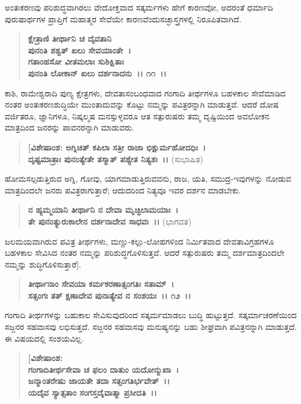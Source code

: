 ಅಂತಃಕರಣವು ಪರಿಶುದ್ಧವಾಗಿರಲು ವೇದೋಕ್ತವಾದ ಸತ್ಕರ್ಮಗಳು ಹೇಗೆ ಕಾರಣವೋ, ಅದರಂತೆ ಧರ್ಮಾದಿ ಪುರುಷಾರ್ಥಗಳ ಪ್ರಾಪ್ತಿಗೆ ಮಹಾತ್ಮರ ಸೇವೆಯೇ ಕಾರಣವೆಂದು\break ಸಚ್ಛಾಸ್ತ್ರಗಳಲ್ಲಿ ನಿರೂಪಿತವಾಗಿದೆ.

\begin{verse}
\textbf{ಕ್ಷೇತ್ರಾಣಿ ತೀರ್ಥಾನಿ ಚ ದೈವತಾನಿ} \\\textbf{ಪುನಂತಿ ಶಶ್ವತ್ ಖಲು ಸೇವಯಾಂತೇ~।}\\\textbf{ಗತಾಂಹಸೋ ವೀತಮಲಾಃ ಸುಶಿಕ್ಷಿತಾಃ} \\\textbf{ಪುನಂತಿ ಲೋಕಾನ್ ಖಲು ದರ್ಶನಾದನು~।। ೧೧~।।}
\end{verse}

ಕಾಶಿ, ರಾಮೇಶ್ವರಾದಿ ಪುಣ್ಯ ಕ್ಷೇತ್ರಗಳು, ದೇವತಾಸಂಬಂಧವಾದ ಗಂಗಾದಿ ತೀರ್ಥಗಳೂ ಬಹಳಕಾಲ ಸೇವೆಮಾಡಿದ ನಂತರ ಅಂತಃಕರಣಶುದ್ಧಿಯೇ ಮುಂತಾದುವನ್ನು ಕೊಟ್ಟು ನಮ್ಮನ್ನು ಪವಿತ್ರರನ್ನಾಗಿ ಮಾಡುತ್ತವೆ. ಆದರೆ ದೋಷ ವರ್ಜಿತರೂ, ಜ್ಞಾನಿಗಳೂ, ನಿಷ್ಕಲ್ಮಷ ಮನಸ್ಸುಳ್ಳವರೂ ಆತ ಸತ್ಪುರುಷರು ತಮ್ಮ ದೃಷ್ಟಿಯಿಂದ ಅವಲೋಕನ ಮಾತ್ರದಿಂದ ಜನರನ್ನು ಪಾವನರನ್ನಾಗಿ ಮಾಡುವರು.

\begin{verse}
\textbf{[ವಿಶೇಷಾಂಶ: ಅಗ್ನಿಚಿತ್ ಕಪಿಲಾ ಸತ್ರೀ ರಾಜಾ ಭಿಕ್ಷುರ್ಮಹೋದಧಿಃ~।}\\\textbf{ದೃಷ್ಟಮಾತ್ರಾಃ ಪುನಂತ್ಯೇತೇ ತಸ್ಮಾತ್ ಪಶ್ಯೇತ ನಿತ್ಯಶಃ~।।} (ಸುಭಾಷಿತ)
\end{verse}

ಹೋಮಸಲ್ಪಡುತ್ತಿರುವ ಅಗ್ನಿ, ಗೋವು, ಯಾಗಮಾಡುತ್ತಿರುವವನು, ರಾಜ, ಯತಿ, ಸಮುದ್ರ-ಇವುಗಳನ್ನು ನೋಡುವ ಮಾತ್ರದಿಂದಲೇ ಜನರು ಪವಿತ್ರರಾಗುತ್ತಾರೆ; ಆದುದರಿಂದ ನಿತ್ಯವೂ ಇವರ ದರ್ಶನ ಮಾಡಬೇಕು.

\begin{verse}
\textbf{ನ ಹ್ಯಮ್ಮಯಾನಿ ತೀರ್ಥಾನಿ ನ ದೇವಾ ಮೃಚ್ಛಿಲಾಮಯಾಃ~।}\\\textbf{ತೇ ಪುನಂತ್ಯುರುಕಾಲೇನ ದರ್ಶನಾದೇವ ಸಾಧವಃ~।।} (ಭಾಗವತ)
\end{verse}

ಜಲಮಯವಾಗಿರುವ ಪವಿತ್ರ ತೀರ್ಥಗಳು, ಮಣ್ಣು-ಕಲ್ಲು-ಲೋಹಗಳಿಂದ ನಿರ್ಮಿತವಾದ ದೇವತಾವಿಗ್ರಹಗಳೂ ಬಹಳಕಾಲ ಸೇವಿಸಿದ ನಂತರ ನಮ್ಮನ್ನು ಪರಿಶುದ್ಧಗೊಳಿಸುತ್ತವೆ. ಆದರೆ ಸತ್ಪುರುಷರು ತಮ್ಮ ದರ್ಶಮಾತ್ರದಿಂದಲೇ ನಮ್ಮನ್ನು ಶುದ್ಧಿಗೊಳಿಸುತ್ತಾರೆ].

\begin{verse}
\textbf{ತೀರ್ಥಾನಾಂ ಸೇವಯಾ ಕರ್ಮಕರಣಾತ್ಸಂಗತಿಃ ಸತಾಮ್~।}\\\textbf{ಸತ್ಸಂಗಃ ತತ್ ಕ್ಷಣಾದೇವ ಪುನಾತ್ಯೇವ ನ ಸಂಶಯಃ~।। ೧೨~।।}
\end{verse}

ಗಂಗಾದಿ ತೀರ್ಥಗಳನ್ನು ಬಹುಕಾಲ ಸೇವಿಸುವುದರಿಂದ ಸತ್ಕರ್ಮಮಾಡಲು ಬುದ್ಧಿ ಹುಟ್ಟುತ್ತದೆ. ಸತ್ಕರ್ಮಾಚರಣೆಯಿಂದ ಸಜ್ಜನರ ಸಹವಾಸವು ಲಭಿಸುತ್ತದೆ. ಸಜ್ಜನರ ಸಹವಾಸವು ಮನುಷ್ಯನನ್ನು ಬಹು ಶೀಘ್ರವಾಗಿ ಪವಿತ್ರನನ್ನಾಗಿ ಮಾಡುತ್ತದೆ. ಈ ವಿಷಯದಲ್ಲಿ ಸಂಶಯವಿಲ್ಲ.

\begin{verse}
\textbf{[ವಿಶೇಷಾಂಶ:}\\\textbf{ಗಂಗಾದಿತೀರ್ಥಸೇವಾ ಚ ಫಲಂ ದಾತುಂ ಯದೋನ್ಮುಖಾ~।}\\\textbf{ಜನ್ಮಾಂತರೇಷು ಜಾಯತೇ ತದಾ ಸತ್ಸಂಗತಿರ್ಭವೇತ್~।।}\\\textbf{ಯದೈವ ಸ್ಯಾತ್ಸತಾಂ ಸಂಗಸ್ತದೈವಾತ್ಮಾ ಪ್ರಸೀದತಿ~।।}
\end{verse}

